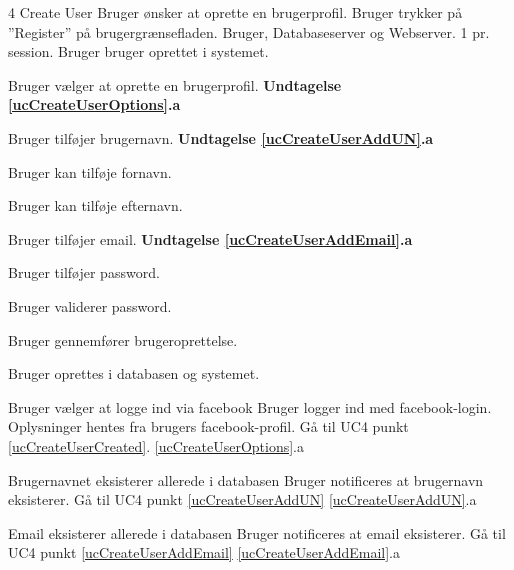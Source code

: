 
\uchead
	{4}
	{Create User}
	{Bruger ønsker at oprette en brugerprofil.}
	{Bruger trykker på ''Register'' på brugergrænsefladen.}
	{Bruger, Databaseserver og Webserver.}
	{}
	{1 pr. session.}
	{Bruger bruger oprettet i systemet.}

\item \label{ucCreateUserOptions} Bruger vælger at oprette en brugerprofil. \newline
\textbf{Undtagelse \ref{ucCreateUserOptions}.a}

\item \label{ucCreateUserAddUN} Bruger tilføjer brugernavn.
\textbf{Undtagelse \ref{ucCreateUserAddUN}.a}

\item Bruger kan tilføje fornavn.
\item Bruger kan tilføje efternavn.

\item \label{ucCreateUserAddEmail} Bruger tilføjer email.
\textbf{Undtagelse \ref{ucCreateUserAddEmail}.a}

\item Bruger tilføjer password.

\item Bruger validerer password.

\item Bruger gennemfører brugeroprettelse.

\item \label{ucCreateUserCreated} Bruger oprettes i databasen og systemet.

\ucdescriptionend


\ucextension
	{Bruger vælger at logge ind via facebook}
	{Bruger logger ind med facebook-login. \newline
	\indent Oplysninger hentes fra brugers facebook-profil. \newline
	\indent Gå til UC4 punkt \ref{ucCreateUserCreated}.
	}
	{\ref{ucCreateUserOptions}.a}

	
	
\ucextension
	{Brugernavnet eksisterer allerede i databasen}
	{Bruger notificeres at brugernavn eksisterer.\newline
	Gå til UC4 punkt \ref{ucCreateUserAddUN}}
	{\ref{ucCreateUserAddUN}.a}
	


\ucextension
	{Email eksisterer allerede i databasen}
	{Bruger notificeres at email eksisterer.\newline
	Gå til UC4 punkt \ref{ucCreateUserAddEmail}}
	{\ref{ucCreateUserAddEmail}.a}
		
